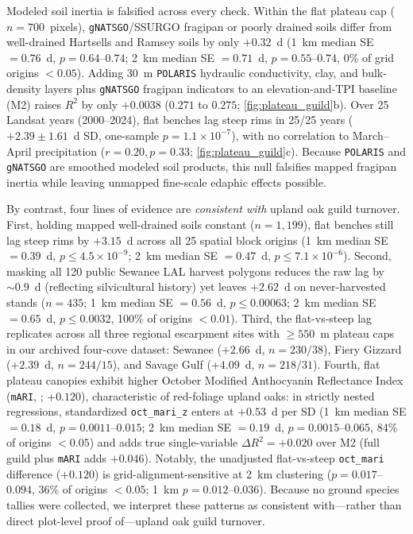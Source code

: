 Modeled soil inertia is falsified across every check. Within the flat plateau cap ($n=700$~pixels), \texttt{gNATSGO}/SSURGO fragipan or poorly drained soils differ from well-drained Hartsells and Ramsey soils by only $+0.32$~d (1~km median SE $= 0.76$~d, $p=0.64$--$0.74$; 2~km median SE $= 0.71$~d, $p=0.55$--$0.74$, 0\% of grid origins $<0.05$). Adding 30~m \texttt{POLARIS} hydraulic conductivity, clay, and bulk-density layers \citep{chaney2019} plus \texttt{gNATSGO} fragipan indicators to an elevation-and-TPI baseline (M2) raises $R^2$ by only $+0.0038$ ($0.271$ to $0.275$; \cref{fig:plateau_guild}b). Over 25 Landsat years (2000--2024), flat benches lag steep rims in 25/25 years ($+2.39 \pm 1.61$~d SD, one-sample $p=1.1 \times 10^{-7}$), with no correlation to March--April precipitation ($r=0.20, p=0.33$; \cref{fig:plateau_guild}c). Because \texttt{POLARIS} and \texttt{gNATSGO} are smoothed modeled soil products, this null falsifies mapped fragipan inertia while leaving unmapped fine-scale edaphic effects possible.

By contrast, four lines of evidence are \emph{consistent with} upland oak guild turnover. First, holding mapped well-drained soils constant ($n=1{,}199$), flat benches still lag steep rims by $+3.15$~d across all 25 spatial block origins (1~km median SE $= 0.39$~d, $p \le 4.5 \times 10^{-9}$; 2~km median SE $= 0.47$~d, $p \le 7.1 \times 10^{-6}$). Second, masking all 120 public Sewanee LAL harvest polygons reduces the raw lag by $\sim 0.9$~d (reflecting silvicultural history) yet leaves $+2.62$~d on never-harvested stands ($n=435$; 1~km median SE $= 0.56$~d, $p \le 0.00063$; 2~km median SE $= 0.65$~d, $p \le 0.0032$, 100\% of origins $<0.01$). Third, the flat-vs-steep lag replicates across all three regional escarpment sites with $\ge 550$~m plateau caps in our archived four-cove dataset: Sewanee ($+2.66$~d, $n=230/38$), Fiery Gizzard ($+2.39$~d, $n=244/15$), and Savage Gulf ($+4.09$~d, $n=218/31$). Fourth, flat plateau canopies exhibit higher October Modified Anthocyanin Reflectance Index (\texttt{mARI}, \citealp{gitelson2001}; $+0.120$), characteristic of red-foliage upland oaks: in strictly nested regressions, standardized \texttt{oct\_mari\_z} enters at $+0.53$~d per SD (1~km median SE $= 0.18$~d, $p=0.0011$--$0.015$; 2~km median SE $= 0.19$~d, $p=0.0015$--$0.065$, 84\% of origins $<0.05$) and adds true single-variable $\Delta R^2=+0.020$ over M2 (full guild plus \texttt{mARI} adds $+0.046$). Notably, the unadjusted flat-vs-steep \texttt{oct\_mari} difference ($+0.120$) is grid-alignment-sensitive at 2~km clustering ($p=0.017$--$0.094$, 36\% of origins $<0.05$; 1~km $p=0.012$--$0.036$). Because no ground species tallies were collected, we interpret these patterns as consistent with---rather than direct plot-level proof of---upland oak guild turnover.

